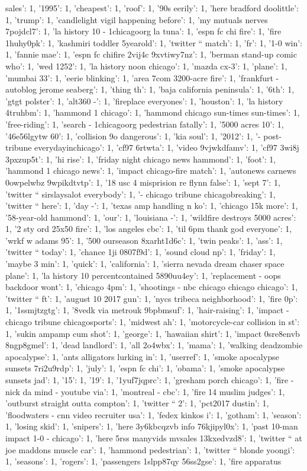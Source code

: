 \documentclass[letterpaper,twocolumn,10pt]{article}
\begin{document}
sales': 1, '1995': 1, 'cheapest': 1, 'roof': 1, '90s eerily': 1, 'here bradford doolittle': 1, 'trump': 1, 'candlelight vigil happening before': 1, 'my mutuals nerves 7pojdcl7': 1, 'la history 10 - 1chicagoorg la tuna': 1, 'espn fc chi fire': 1, 'fire 1huhy0pk': 1, 'kashmiri toddler 5yearold': 1, 'twitter `` match': 1, 'fr': 1, '1-0 win': 1, 'fannie mae': 1, 'espn fc chifire 2vij4c 9xvtiwy7nz': 1, 'berman stand-up comic who': 1, 'wed 1252': 1, 'la history noon chicago': 1, 'mazda cx-3': 1, 'plane': 1, 'mumbai 33': 1, 'eerie blinking': 1, 'area 7com 3200-acre fire': 1, 'frankfurt - autoblog jerome seaberg': 1, 'thing th': 1, 'baja california peninsula': 1, '6th': 1, 'gtgt polster': 1, 'alt360 -': 1, 'fireplace everyones': 1, 'houston': 1, 'la history 4truhbm': 1, 'hammond 1 chicago': 1, 'hammond chicago sun-times sun-times': 1, 'free-riding': 1, 'search - 1chicagoorg pedestrian fatally': 1, '5000 acres 10': 1, '46e56lgytw 60': 1, 'collision 9o dangerous': 1, 'kia soul': 1, '2012': 1, '- post-tribune everydayinchicago': 1, 'cf97 6rtwta': 1, 'video 9vjwkdfamv': 1, 'cf97 3wi8j 3pxzup5t': 1, 'hi rise': 1, 'friday night chicago news hammond': 1, 'foot': 1, 'hammond 1 chicago news': 1, 'impact chicago-fire match': 1, 'autonews carnews 0owpelwbz 9wpikdtvtp': 1, '18 usc 4 misprision re flynn false': 1, 'sept 7': 1, 'twitter `` sirslaysalot everybody': 1, '- chicago tribune chicagobreaking': 1, 'twitter `` here': 1, 'day -': 1, 'texas amp handling n ko': 1, 'chicago 15k more': 1, '58-year-old hammond': 1, 'our': 1, 'louisiana -': 1, 'wildfire destroys 5000 acres': 1, '2 sty ord 25x50 fire': 1, 'los angeles cbc': 1, 'til 6pm thank god everyone': 1, 'wrkf w adams 95': 1, '500 ourseason 8xarht1d6c': 1, 'twin peaks': 1, 'ass': 1, 'twitter `` today': 1, 'chance 1ji 0807f9d': 1, 'sound cloud np': 1, 'friday': 1, 'maybe 3 min': 1, 'quick': 1, 'california': 1, 'sierra nevada dream chaser space plane': 1, 'la history 10 percentcontained 5890uu4ey': 1, 'replacement - oops backdoor wont': 1, 'chicago 4pm': 1, 'shootings - nbc chicago chicago chicago': 1, 'twitter `` ft': 1, 'august 10 2017 gun': 1, 'nycs tribeca neighborhood': 1, 'fire 0p': 1, '1ssmjtzgtg': 1, '8vedk via metrouk 9bpbmsuf': 1, 'hair-raising': 1, 'impact - chicago tribune chicagosports': 1, 'midwest ah': 1, 'motorcycle-car collision in st': 1, 'sukin ampamp cum shot': 1, 'george': 1, 'hawaiian shirt': 1, 'impact 0sre8envb 8ngp8gmel': 1, 'dead landlord': 1, 'all 2o4wbx': 1, 'mama': 1, 'walking deadzombie apocalypse': 1, 'ants alligators lurking in': 1, 'userref': 1, 'smoke apocalypse sunsets 7ri2u9rdp': 1, 'july': 1, 'espn fc chi': 1, 'obama': 1, 'smoke apocalypse sunsets jad': 1, '15': 1, '19': 1, '1yuf7jqprc': 1, 'gresham porch chicago': 1, 'fire - nick da mind - youtube via': 1, 'montreal - cbc': 1, 'fire 14 muslim judges': 1, 'outburst straight outta compton': 1, 'twitter `` 2': 1, 'pct2017 dustin': 1, 'floodwaters - cnn video recruiter usa': 1, 'fedex kinkos i': 1, 'gotham': 1, 'season': 1, 'losing skid': 1, 'snipers': 1, 'here 3y6kbcqzvb info 76kjipyl0x': 1, 'past 10-man impact 1-0 - chicago': 1, 'here 5rss manyvids mvsales 13kxedvzd8': 1, 'twitter `` at joe maddons muscle car': 1, 'hammond pedestrian': 1, 'twitter `` blonde yoongi': 1, 'seasons': 1, 'rogers': 1, 'passengers 1slpp87qy 56ss2gse': 1, 'fire apparatus 
\end{document}
